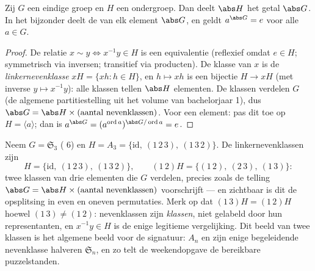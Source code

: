 \begin{theorem}[Lagrange]\label{thm:b2:structures:lagrange}
Zij $G$ een eindige groep en $H$ een ondergroep. Dan deelt $\abs
H$ het getal $\abs G$. In het
bijzonder deelt de  van elk element $\abs G$, en geldt
$a^{\abs G} = e$ voor alle $a \in G$.
\end{theorem}

\begin{proof}
De relatie $x \sim y \iff x^{-1}y \in H$ is een equivalentie
(reflexief omdat $e \in H$; symmetrisch via inversen; transitief
via producten). De klasse van $x$ is de \emph{linkernevenklasse}
$xH = \{xh : h \in H\}$, en $h \mapsto xh$ is een bijectie $H \to
xH$ (met inverse $y \mapsto x^{-1}y$): alle klassen tellen $\abs
H$ elementen. De klassen verdelen $G$ (de algemene
partitiestelling uit het volume van bachelorjaar 1), dus $\abs G =
\abs H \times (\text{aantal nevenklassen})$. Voor een element:
pas dit toe op $H = \langle a\rangle$; dan is $a^{\abs G} =
(a^{\operatorname{ord} a})^{\abs G / \operatorname{ord} a} = e$.
\end{proof}

\begin{example}\label{ex:b2:structures:cosets}
Neem $G = \mathfrak{S}_3$ ( $6$) en $H = A_3 =
\{\mathrm{id},\ (1\,2\,3),\ (1\,3\,2)\}$. De linkernevenklassen
zijn
\[
H = \{\mathrm{id},\ (1\,2\,3),\ (1\,3\,2)\},
\qquad
(1\,2)H = \{(1\,2),\ (2\,3),\ (1\,3)\} :
\]
twee klassen van drie elementen die $G$ verdelen, precies zoals
de telling $\abs G = \abs H \times (\text{aantal nevenklassen})$
voorschrijft --- en zichtbaar is dit de opsplitsing in even en
oneven permutaties. Merk op dat $(1\,3)H = (1\,2)H$ hoewel
$(1\,3) \neq (1\,2)$: nevenklassen zijn \emph{klassen}, niet
gelabeld door hun representanten, en $x^{-1}y \in H$ is de enige
legitieme vergelijking. Dit beeld van twee klassen is het
algemene beeld voor de signatuur: $A_n$ en zijn enige
begeleidende nevenklasse halveren $\mathfrak{S}_n$, en zo telt de
weekendopgave de bereikbare puzzelstanden.
\end{example}

